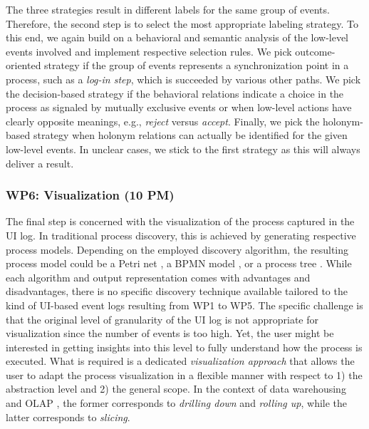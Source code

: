  The three strategies  result in different labels for the same group of events. Therefore, the second step is to select the most appropriate labeling strategy. To this end, we again build on a  behavioral and semantic analysis of the low-level events involved and implement respective selection rules.  We pick outcome-oriented strategy if the group of events represents a synchronization point in a process, such as a \emph{log-in step}, which is succeeded by various other paths. We pick the decision-based strategy if the behavioral relations indicate a choice in the process as signaled by mutually exclusive events or when low-level actions have clearly opposite meanings, e.g., \emph{reject} versus \emph{accept}. Finally, we pick the holonym-based strategy when holonym relations can actually be identified for the given low-level events. In unclear cases, we stick to the first strategy as this will always deliver a result.  


\subsubsection{WP6: Visualization (10 PM)}
\label{sec:wp6}

The final step is concerned with the visualization of the process captured in the UI log. In traditional process discovery, this is achieved by generating respective process models. Depending on the employed discovery algorithm, the resulting process model could be a Petri net \cite{van2004workflow}, a BPMN model \cite{conforti2016bpmn}, or a process tree \cite{leemans2013discovering}. While each algorithm and output representation comes with advantages and disadvantages, there is no specific discovery technique available tailored to the kind of UI-based event logs resulting from WP1 to WP5. %
The specific challenge is that the original level of granularity of the UI log is not appropriate for visualization since the number of events is too high. Yet, the user might be interested in getting insights into this level to fully understand how the process is executed. What is required is a dedicated \textit{visualization approach} that allows the user to adapt the process visualization in a flexible manner with respect to 1) the abstraction level and 2) the general scope. In the context of data warehousing and OLAP \cite{chaudhuri1997overview}, the former corresponds to \textit{drilling down} and \textit{rolling up}, while the latter corresponds to \textit{slicing}. 

